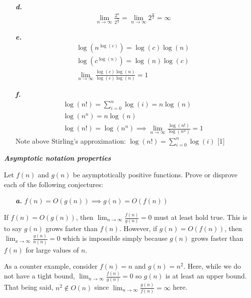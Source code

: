 \documentclass[a4paper,11pt]{article}
\theoremstyle{mytheor}
\begin{document}
\begin{itemize}
    \item[\textbf{\textit{d.}}] 
    \begin{align}
        \lim_{n\to\infty}\frac{2^n}{2^{\frac{n}{2}}} = \lim_{n\to\infty}
            2^{\frac{n}{2}} = \infty
    \end{align}
    
    \item[\textbf{\textit{e.}}]
    \begin{align} 
        \log(n^{\log(c)}) = \log(c)\log(n) \\
        \log(c^{\log(n)}) = \log(n)\log(c) \\
        \lim_{n\to\infty} \frac{\log(c)\log(n)}{\log(c)\log(n)} = 1
    \end{align}    
    
    \item[\textbf{\textit{f.}}] 
    \begin{align}
        \log(n!) = \sum_{i=0}^{n} \log(i) = n\log(n) \\
        \log(n^n) = n\log(n) \\
        \log(n!) = \log(n^n) \implies \lim_{n\to\infty} 
            \frac{\log(n!)}{\log(n^n)} = 1
    \end{align}
    Note above Stirling's approximation: $\log(n!) = \sum_{i=0}^{n} \log(i)$ [1]
\end{itemize}


\begin{framed}
    \textbf{\textit{Asymptotic notation properties}}
    
    Let $f(n)$ and $g(n)$ be asymptotically positive functions. Prove or 
    disprove each of the following conjectures:
        
    \begin{enumerate}
        \item[\textbf{\textit{a.}}] $f(n) = O(g(n)) \implies g(n) = O(f(n))$
    \end{enumerate}
\end{framed}

If $f(n) = O(g(n))$, then $\lim_{n \to \infty} \frac{f(n)}{g(n)} = 0$ must at 
least hold true. This is to say $g(n)$ grows faster than $f(n)$. However, if 
$g(n) = O(f(n))$, then $\lim_{x \to \infty} \frac{g(n)}{n(n)} = 0$ which is
impossible simply because $g(n)$ grows faster than $f(n)$ for large values of
$n$. 

As a counter example, consider $f(n) = n$ and $g(n) = n^2$. Here, while we do 
not have a tight bound, $\lim_{n \to \infty} \frac{f(n)}{g(n)} = 0$ so $g(n)$ is
at least an upper bound. That being said, $n^2 \notin O(n)$ since $\lim_{n \to \infty} \frac{g(n)}{f(n)} = \infty$ here. 
\end{document}
